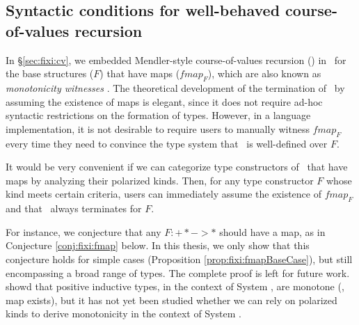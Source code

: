 \subsection{Syntactic conditions for well-behaved course-of-values recursion}
\label{ssec:fixi:theory:cv}
In \S\ref{sec:fixi:cv}, we embedded Mendler-style course-of-values
recursion (\McvPr) in \Fixi\ for the base structures ($F$)
that have maps ($\textit{fmap}_F$), which are also known as
\emph{monotonicity witnesses} \cite{Mat98,Mat99}. The theoretical development of
the termination of \McvPr\ by assuming the existence of maps is elegant, since
it does not require ad-hoc syntactic restrictions on the formation of types.
However, in a language implementation, it is not desirable to require users to
manually witness $\textit{fmap}_F$ every time they need to convince
the type system that \McvPr\ is well-defined over $F$.

It would be very convenient if we can categorize type constructors of \Fixi\ that
have maps by analyzing their polarized kinds. Then, for any type constructor $F$
whose kind meets certain criteria, users can immediately assume the existence
of $\textit{fmap}_F$ and that \McvPr\ always terminates for $F$.

For instance, we conjecture that any $F: +* -> *$ should have a map, as in
Conjecture \ref{conj:fixi:fmap} below. In this thesis, we only show that this
conjecture holds for simple cases (Proposition \ref{prop:fixi:fmapBaseCase}),
but still encompassing a broad range of types.
The complete proof is left for future work.
\citet{Mat99} showd that positive inductive types, in the context of System \F,
are monotone (\ie, map exists), but it has not yet been studied
whether we can rely on polarized kinds to derive monotonicity
in the context of System \Fw.

